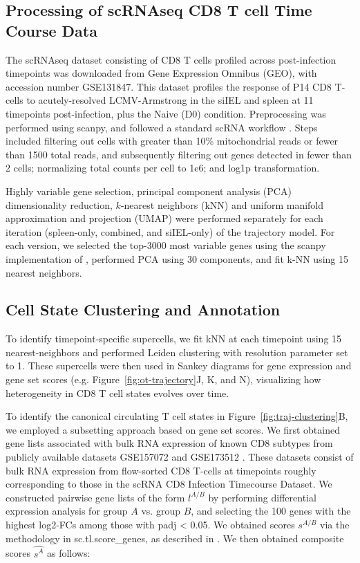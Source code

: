 \subsection{Processing of scRNAseq CD8 T cell Time Course Data }

The scRNAseq dataset consisting of CD8 T cells profiled across post-infection timepoints \citep{kurdEarlyPrecursorsMolecular2020, milnerHeterogenousPopulationsTissueResident2020} was downloaded from Gene Expression Omnibus (GEO), with accession number GSE131847. This dataset profiles the response of P14 CD8 T-cells to acutely-resolved LCMV-Armstrong in the siIEL and spleen at 11 timepoints post-infection, plus the Naive (D0) condition. Preprocessing was performed using scanpy, and followed a standard scRNA workflow \citep{lueckenCurrentBestPractices2019}. Steps included filtering out cells with greater than 10\% mitochondrial reads or fewer than 1500 total reads, and subsequently filtering out genes detected in fewer than 2 cells; normalizing total counts per cell to 1e6; and log1p transformation.

Highly variable gene selection, principal component analysis (PCA) dimensionality reduction, $k$-nearest neighbors (kNN) and uniform manifold approximation and projection (UMAP) were performed separately for each iteration (spleen-only, combined, and siIEL-only) of the trajectory model. For each version, we selected the top-3000 most variable genes using the scanpy implementation of \citep{satijaSpatialReconstructionSinglecell2015}, performed PCA using 30 components, and fit k-NN using 15 nearest neighbors.

\subsection{Cell State Clustering and Annotation}

To identify timepoint-specific supercells, we fit kNN at each timepoint using 15 nearest-neighbors and performed Leiden clustering with resolution parameter set to 1. These supercells were then used in Sankey diagrams for gene expression and gene set scores (e.g. Figure~\ref{fig:ot-trajectory}J, K, and N), visualizing how heterogeneity in CD8 T cell states evolves over time.

To identify the canonical circulating T cell states in Figure~\ref{fig:traj-clustering}B, we employed a subsetting approach based on gene set scores. We first obtained gene lists associated with bulk RNA expression of known CD8 subtypes from publicly available datasets GSE157072 \citep{milnerDelineationMolecularlyDistinct2020} and GSE173512 \citep{milnerBromodomainProteinBRD42021}. These datasets consist of bulk RNA expression from flow-sorted CD8 T-cells at timepoints roughly corresponding to those in the scRNA CD8 Infection Timecourse Dataset. We constructed pairwise gene lists of the form \(l^{A/B}\) by performing differential expression analysis for group \(A\) vs. group \(B\), and selecting the 100 genes with the highest log2-FCs among those with padj \textless{} 0.05. We obtained scores \(s^{A/B}\) via the methodology in sc.tl.score\_genes, as described in \citep{satijaSpatialReconstructionSinglecell2015}. We then obtained composite scores \(\widehat{s^{A}}\) as follows:

